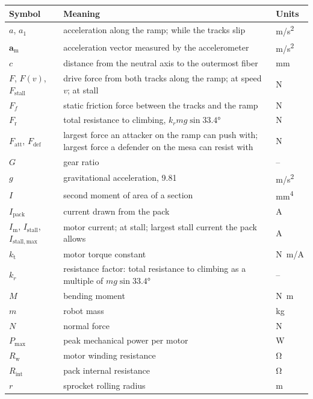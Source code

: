 {\small\renewcommand{\arraystretch}{0.84}
\begin{tabularx}{\textwidth}{@{}l L l@{}}
  \toprule
  \textbf{Symbol} & \textbf{Meaning} & \textbf{Units} \\
  \midrule
  $a$, $a_1$ & acceleration along the ramp; while the tracks slip & \unit{m/s^2} \\
  $\bm{a}_\mathrm{m}$ & acceleration vector measured by the accelerometer & \unit{m/s^2} \\
  $c$ & distance from the neutral axis to the outermost fiber & \unit{mm} \\
  $F$, $F(v)$, $F_\mathrm{stall}$ & drive force from both tracks along the ramp; at speed $v$; at stall & \unit{N} \\
  $F_f$ & static friction force between the tracks and the ramp & \unit{N} \\
  $F_\mathrm{r}$ & total resistance to climbing, $k_r m g \sin\ang{33.4}$ & \unit{N} \\
  $F_\mathrm{att}$, $F_\mathrm{def}$ & largest force an attacker on the ramp can push with; largest force a defender on the mesa can resist with & \unit{N} \\
  $G$ & gear ratio & -- \\
  $g$ & gravitational acceleration, 9.81 & \unit{m/s^2} \\
  $I$ & second moment of area of a section & \unit{mm^4} \\
  $I_\mathrm{pack}$ & current drawn from the pack & \unit{A} \\
  $I_\mathrm{m}$, $I_\mathrm{stall}$, $I_\mathrm{stall,max}$ & motor current; at stall; largest stall current the pack allows & \unit{A} \\
  $k_\mathrm{t}$ & motor torque constant & \unit{N.m/A} \\
  $k_r$ & resistance factor: total resistance to climbing as a multiple of $m g \sin\ang{33.4}$ & -- \\
  $M$ & bending moment & \unit{N.m} \\
  $m$ & robot mass & \unit{kg} \\
  $N$ & normal force & \unit{N} \\
  $P_\mathrm{max}$ & peak mechanical power per motor & \unit{W} \\
  $R_\mathrm{w}$ & motor winding resistance & \unit{\ohm} \\
  $R_\mathrm{int}$ & pack internal resistance & \unit{\ohm} \\
  $r$ & sprocket rolling radius & \unit{m} \\

\end{tabularx}}
